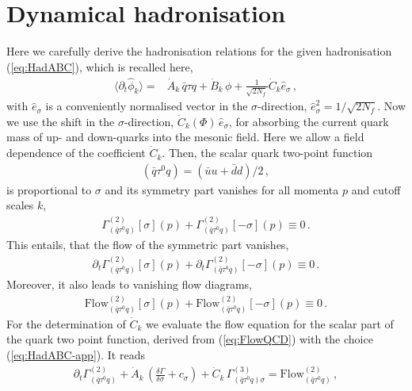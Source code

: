\documentclass[%
reprint,
superscriptaddress,
showpacs,preprintnumbers,
 amsmath,amssymb,
 aps,
prd,
]{revtex4-1}
\def\eq#1{(\ref{#1})}
\begin{document}
\section{Dynamical hadronisation}
\label{app:DynHad-c}

Here we carefully derive the hadronisation relations for the given
hadronisation \eq{eq:HadABC}, which is recalled here,
%
\begin{align}\label{eq:HadABC-app}
  \langle   \partial_t \hat \phi_k\rangle=
  &\dot{A}_k \,\bar{q}\tau q+\dot{B}_k
    \,\phi + \frac1{\sqrt{2 N_f}} \dot{C}_k \hat e_\sigma\,,
\end{align}
%
with $\hat e_\sigma$ is a conveniently normalised vector in the
$\sigma$-direction, $\hat e_\sigma^2=1/\sqrt{2 N_f}$. Now we use the
shift in the $\sigma$-direction, $\dot {C}_k(\Phi) \, \hat e_\sigma$,
for absorbing the current quark mass of up- and down-quarks into the
mesonic field. Here we allow a field dependence of the coefficient
$\dot {C}_k$. Then, the scalar quark two-point function
%
\begin{align}\label{eq:scalarG2}
  (\bar q \tau^0 q) = (\bar u u + \bar d d)/2\,,
\end{align}
%
is proportional to $\sigma$ and its symmetry part vanishes for all
momenta $p$ and cutoff scales $k$,
%
\begin{align}\label{eq:m_cur=0}
  \Gamma^{(2)}_{(\bar q\tau^0 q)}[\sigma](p)+
  \Gamma^{(2)}_{(\bar q\tau^0 q)}[-\sigma](p)\equiv 0\,. 
\end{align}
%
This entails, that the flow of the symmetric part vanishes, 
%
\begin{align}\label{eq:d_t-m_cur=0}
  \partial_t \Gamma^{(2)}_{(\bar q\tau^0 q)}[\sigma](p)+\partial_t
  \Gamma^{(2)}_{(\bar q\tau^0 q)}[-\sigma](p)\equiv 0\,. 
\end{align}
%
Moreover, it also leads to vanishing flow diagrams,  
%
\begin{align}\label{eq:diag-m_cur=0}
  \textrm{Flow}^{(2)}_{(\bar q\tau^0 q)}[\sigma](p)+
  \textrm{Flow}^{(2)}_{(\bar q\tau^0 q)}[-\sigma](p)\equiv 0\,. 
\end{align}
%
For the determination of $\dot{C}_k$ we evaluate the flow equation for
the scalar part of the quark two point function, derived from
\eq{eq:FlowQCD} with the choice \eq{eq:HadABC-app}. It reads
%
\begin{align}
  \partial_t \Gamma_{(\bar q\tau^0 q)}^{(2)}+
  \dot{A}_k\, \left( \frac{\delta \Gamma}{\delta \sigma} +
  c_\sigma\right) + \dot{C}_k\,
  \Gamma^{(3)}_{(\bar q \tau^0q) \sigma}=
  \textrm{Flow}^{(2)}_{(\bar q\tau^0 q)}
  \,,\label{eq:Gbarqq}
\end{align}
\end{document}
